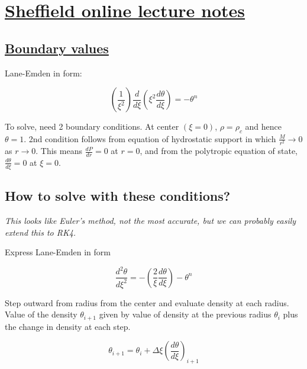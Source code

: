 \documentclass{article}
\begin{document}
    \section{\href{http://www.vikdhillon.staff.shef.ac.uk/teaching/phy213/phy213_le.html}{Sheffield online lecture notes}}

    \subsection{\href{http://www.vikdhillon.staff.shef.ac.uk/teaching/phy213/phy213_polytropes.html}{Boundary values}}

    Lane-Emden in form:

    \begin{equation}
        \left(\frac{1}{\xi^2}\right)\frac{d}{d\xi}\left(\xi^2\frac{d\theta}{d\xi}\right)=-\theta^n
    \end{equation}

    To solve, need 2 boundary conditions. At center \(\left(\xi = 0 \right)\),
    \(\rho=\rho_c\) and hence \(\theta=1\). 2nd condition follows from equation
    of hydrostatic support in which \(\frac{M}{r^2}\rightarrow 0\) as
    \(r\rightarrow 0\). This means \(\frac{dP}{dr}=0\) at \(r=0\), and from the
    polytropic equation of state, \(\frac{d\theta}{d\xi}=0\) at \(\xi=0\).

    \subsection{How to solve with these conditions?}

    \emph{This looks like Euler's method, not the most accurate, but we can
    probably easily extend this to RK4.}

    Express Lane-Emden in form

    \begin{equation}
        \frac{d^2\theta}{d\xi^2} =
        -\left(\frac{2}{\xi}\frac{d\theta}{d\xi}\right)-\theta^n
        \label{eq:leshef}
    \end{equation}

    Step outward from radius from the center and evaluate density at each
    radius. Value of the density \(\theta_{i+1}\) given by value of density at
    the previous radius \(\theta_i\) plus the change in density at each step.

    \begin{equation}
        \theta_{i+1}=\theta_i+\Delta\xi \left(\frac{d\theta}{d\xi}\right)_{i+1}
    \end{equation}
\end{document}
